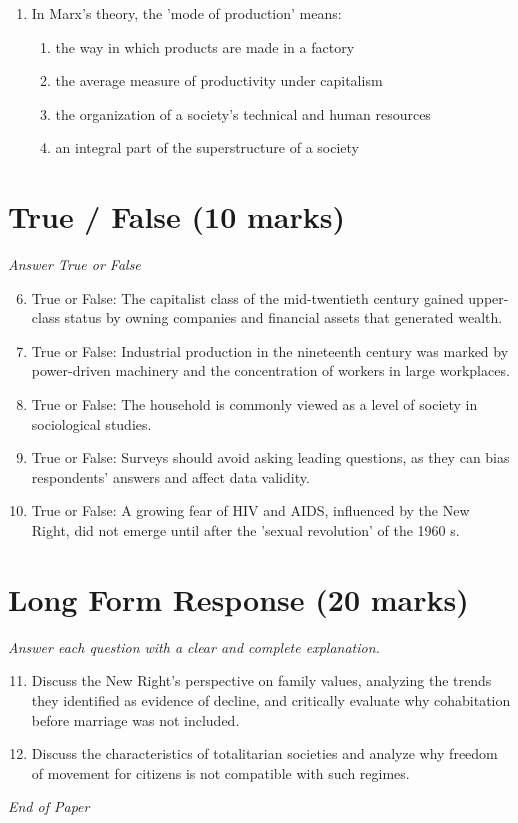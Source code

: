 \documentclass[12pt]{article}
\begin{document}
\begin{enumerate}[label=\arabic*.]
\begin{enumerate}[label=(\alph*)]
    \item increasingly detached from health authorities and providers of private health care
    \item less inclined to run themselves efficiently, as demand for health care was falling
\end{enumerate}
\item In Marx's theory, the 'mode of production' means:
\begin{enumerate}[label=(\alph*)]
    \item the way in which products are made in a factory
    \item the average measure of productivity under capitalism
    \item the organization of a society's technical and human resources
    \item an integral part of the superstructure of a society
\end{enumerate}
\end{enumerate}

\section*{True / False (10 marks)}
\textit{Answer True or False}
\begin{enumerate}[label=\arabic*.]
\setcounter{enumi}{5}
\item True or False: The capitalist class of the mid-twentieth century gained upper-class status by owning companies and financial assets that generated wealth.
\item True or False: Industrial production in the nineteenth century was marked by power-driven machinery and the concentration of workers in large workplaces.
\item True or False: The household is commonly viewed as a level of society in sociological studies.
\item True or False: Surveys should avoid asking leading questions, as they can bias respondents' answers and affect data validity.
\item True or False: A growing fear of HIV and AIDS, influenced by the New Right, did not emerge until after the 'sexual revolution' of the 1960 s.
\end{enumerate}

\section*{Long Form Response (20 marks)}
\textit{Answer each question with a clear and complete explanation.}
\begin{enumerate}[label=\arabic*.]
\setcounter{enumi}{10}
\item Discuss the New Right's perspective on family values, analyzing the trends they identified as evidence of decline, and critically evaluate why cohabitation before marriage was not included.
\item Discuss the characteristics of totalitarian societies and analyze why freedom of movement for citizens is not compatible with such regimes.
\end{enumerate}

\vfill
\noindent\textit{End of Paper}
\end{document}
